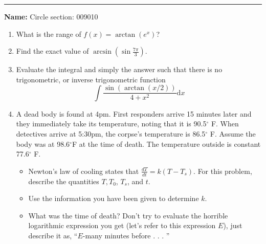 \documentclass[11pt]{article}
\newcommand{\red}{\textcolor{red}}
\begin{document}
    \hrule
    \vspace{.5cm}
    \noindent\textbf{Name:} \underline{\qquad\qquad\qquad\qquad\qquad\qquad\qquad\qquad\qquad\qquad\qquad\qquad\qquad}  Circle section: 009\phantom{.....}010

    \begin{enumerate}
        \item What is the range of $\displaystyle f(x) =  \arctan(e^x)$?\\[3em]
        
        \item Find the exact value of $\displaystyle \arcsin(\sin\frac{ 7\pi}{3} )$.\\[4em]
        \item  Evaluate the integral and simply the answer such that there is no trigonometric, or  inverse trigonometric function
        $$\int \frac{\sin (\arctan(x/2))}{4+x^2}\mathrm{d} x$$
        \newpage
        \item A dead body is found at 4pm. 
        First responders arrive 15 minutes later and they immediately take its temperature, noting that it is 90.5$^\circ$ F.
        When detectives arrive at 5:30pm, the corpse's temperature is 86.5$^\circ$ F. Assume the body was at 98.6$^\circ $F at the time of death.
        The temperature outside is constant 77.6$^\circ$ F. \\
        \begin{itemize}
            \item Newton's law of cooling states that $\frac{dT}{dt} = k(T-T_s)$. 
            For this problem, describe the quantities $T,T_{0}$, $T_{s}$, and $t$.\\[5em]
            \item Use the information you have been given to determine $k$.\\[7em]
            \item What was the time of death? Don't try to evaluate the horrible logarithmic expression you get (let's refer to this expression $E$), just describe it as, ``$E$-many minutes before . . . ''\\[8em]
        \end{itemize}
    \end{enumerate}    
\end{document}
